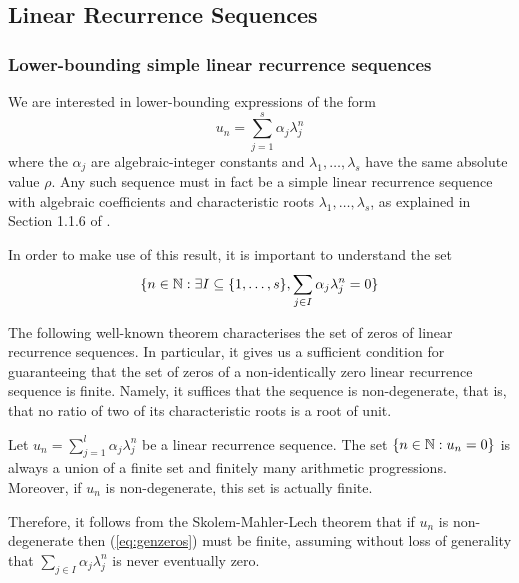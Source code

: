 \subsection{Linear Recurrence Sequences}

\subsubsection{Lower-bounding simple linear recurrence sequences}

We are interested in lower-bounding expressions of the form
\begin{equation}
\label{eq:sum}
u_n=\sum\limits_{j=1}^s\alpha_j\lambda_j^n
\end{equation}
where the $\alpha_j$ are algebraic-integer constants and $\lambda_1,\ldots,\lambda_s$ have the same absolute value $\rho$. Any such sequence must in fact be a simple linear recurrence sequence with algebraic coefficients and characteristic roots $\lambda_1,\ldots,\lambda_s$, as explained in Section 1.1.6 of \cite{BOOK}.

In order to make use of this result, it is important to understand the set
\begin{equation}
\lbrace n\in\Naturals: \exists I\subseteq \lbrace 1,\ldots,s\rbrace, \sum\limits_{j\in I}\alpha_j\lambda_j^n=0\rbrace
\label{eq:genzeros}
\end{equation}

The following well-known theorem characterises the set of zeros of
linear recurrence sequences. In particular, it gives us a sufficient
condition for guaranteeing that the set of zeros of a non-identically
zero linear recurrence sequence is finite. Namely, it suffices that the sequence is non-degenerate, that is, that no ratio of two of its characteristic roots is a root of unit.

\begin{theorem}
Let $u_n=\sum\limits_{j=1}^l \alpha_j\lambda_j^n$ be a linear recurrence sequence. The set $\lbrace n\in\mathbb{N}: u_n=0\rbrace$ is always a union of a finite set and finitely many arithmetic progressions. Moreover, if $u_n$ is non-degenerate, this set is actually finite.
\end{theorem}

Therefore, it follows from the Skolem-Mahler-Lech theorem that if $u_n$ is non-degenerate  then (\ref{eq:genzeros}) must be finite, assuming without loss of generality that $\sum\limits_{j\in I}\alpha_j\lambda_j^n$ is never eventually zero.

